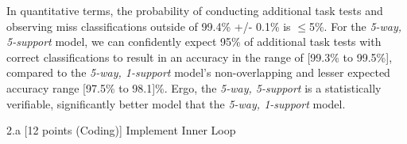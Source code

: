 \begin{answer}
    In quantitative terms, the probability of conducting additional task tests and observing miss classifications outside of 99.4\% +/- 0.1\% is $\leq$5\%. For the \textit{5-way, 5-support} model, we can confidently expect 95\% of additional task tests with correct classifications to result in an accuracy in the range of [99.3\% to 99.5\%], compared to the \textit{5-way, 1-support} model's non-overlapping and lesser expected accuracy range [97.5\% to 98.1]\%. Ergo, the \textit{5-way, 5-support} is a statistically verifiable, significantly better model that the \textit{5-way, 1-support} model.
    \\
    
\end{answer}


\clearpage

\LARGE
2.a [12 points (Coding)] Implement Inner Loop
\\
\normalsize



